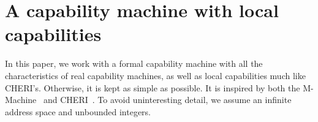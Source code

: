 \documentclass[compsoc,conference,letterpaper,fleqn]{IEEEtran}
\begin{document}





\section{A capability machine with local capabilities}
\label{sec:capab-mach-with}
In this paper, we work with a formal capability machine with all the
characteristics of real capability machines, as well as local capabilities much
like CHERI's. Otherwise, it is kept as simple as possible. It is inspired by
both the M-Machine~\cite{Carter:1994:HSF:195473.195579} and
CHERI~\cite{Watson2015Cheri}. To avoid uninteresting detail, we assume an
infinite address space and unbounded integers.
\end{document}
